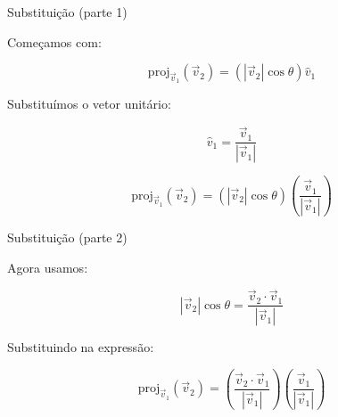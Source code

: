 \documentclass{beamer}
\begin{document}
\begin{frame}{Substituição (parte 1)}


\vspace{0.5cm}

Começamos com:

\[
\mathrm{proj}_{\vec{v}_1}(\vec{v}_2)
=
(|\vec{v}_2|\cos\theta)\hat{v}_1
\]

\vspace{0.5cm}

Substituímos o vetor unitário:

\[
\hat{v}_1 = \frac{\vec{v}_1}{|\vec{v}_1|}
\]

\vspace{0.5cm}

\[
\mathrm{proj}_{\vec{v}_1}(\vec{v}_2)
=
(|\vec{v}_2|\cos\theta)
\left(\frac{\vec{v}_1}{|\vec{v}_1|}\right)
\]

\end{frame}
\begin{frame}{Substituição (parte 2)}


\vspace{0.5cm}

Agora usamos:

\[
|\vec{v}_2|\cos\theta =
\frac{\vec{v}_2 \cdot \vec{v}_1}{|\vec{v}_1|}
\]

\vspace{0.5cm}

Substituindo na expressão:

\[
\mathrm{proj}_{\vec{v}_1}(\vec{v}_2)
=
\left(\frac{\vec{v}_2 \cdot \vec{v}_1}{|\vec{v}_1|}\right)
\left(\frac{\vec{v}_1}{|\vec{v}_1|}\right)
\]

\end{frame}
\end{document}
